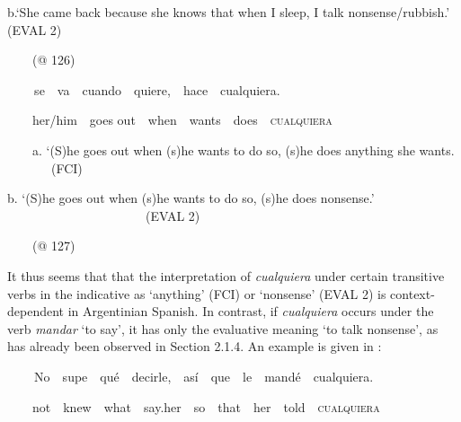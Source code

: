 \begin{styleStandard}
b.‘She came back because she knows that when I sleep, I talk nonsense/rubbish.’ (EVAL 2)
\end{styleStandard}

\begin{styleStandard}
\ \ \ \ (@ 126)
\end{styleStandard}

\begin{styleStandard}
\textbf{\ \ }\ \ se\ \ va\ \ cuando\ \ quiere,\ \ hace\ \ cualquiera.
\end{styleStandard}

\begin{styleStandard}
\ \ \ \ her/him\ \ goes out\ \ when\ \ wants\ \ does\ \ \textsc{cualquiera}
\end{styleStandard}

\begin{styleStandard}
\ \ \ \ a. ‘(S)he goes out when (s)he wants to do so, (s)he does anything she wants. \ \ \ \ \ \ \ (FCI)
\end{styleStandard}

\begin{styleStandard}
b. ‘(S)he goes out when (s)he wants to do so, (s)he does nonsense.’ \ \ \ \ \ \ \ \ \ \ \ \ \ \ \ \ \ \ \ \ \ \ (EVAL 2)
\end{styleStandard}

\begin{styleStandard}
\ \ \ \ (@ 127)
\end{styleStandard}

\begin{styleStandard}
It thus seems that that the interpretation of \textit{cualquiera} under certain transitive verbs in the indicative as ‘anything’ (FCI) or ‘nonsense’ (EVAL 2) is context-dependent in Argentinian Spanish. In contrast, if \textit{cualquiera} occurs under the verb \textit{mandar} ‘to say’, it has only the evaluative meaning ‘to talk nonsense’, as has already been observed in Section 2.1.4. An example is given in :
\end{styleStandard}

\begin{styleStandard}
\label{bkm:Ref150786556}\textbf{\ \ }\ \ No\ \ supe\ \ qué\ \ decirle,\ \ así\ \ que\ \ le\ \ mandé\ \ cualquiera.
\end{styleStandard}

\begin{styleStandard}
\ \ \ \ not\ \ knew\ \ what\ \ say.her\ \ so\ \ that\ \ her\ \ told\ \ \textsc{cualquiera}
\end{styleStandard}

